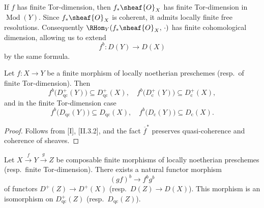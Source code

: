 \setcounter{page}{166}
If \(f\) has finite Tor-dimension, then \(f_*\sheaf{O}_X\) has finite Tor-dimension in \(\operatorname{Mod}(Y)\). Since \(f_*\sheaf{O}_X\) is coherent, it admits locally finite free resolutions. Consequently \(\RHom_Y(f_*\sheaf{O}_X,\,\cdot)\) has finite cohomological dimension, allowing us to extend
\[
f^{b}\colon D(Y) \to D(X)
\]
by the same formula.

\begin{proposition}
Let \(f: X \to Y\) be a finite morphism of locally noetherian preschemes (resp.\ of finite Tor-dimension). Then
\[
f^{b}\bigl(D_{\mathrm{qc}}^{+}(Y)\bigr) \subseteq D_{\mathrm{qc}}^{+}(X),\quad
f^{b}\bigl(D_{\mathrm{c}}^{+}(Y)\bigr) \subseteq D_{\mathrm{c}}^{+}(X),
\]
and in the finite Tor-dimension case
\[
f^{b}\bigl(D_{\mathrm{qc}}(Y)\bigr) \subseteq D_{\mathrm{qc}}(X),\quad
f^{b}\bigl(D_{\mathrm{c}}(Y)\bigr) \subseteq D_{\mathrm{c}}(X).
\]
\end{proposition}

\begin{proof}
Follows from [I], [II.3.2], and the fact \(\overline{f}^*\) preserves quasi-coherence and coherence of sheaves.
\end{proof}

\setcounter{page}{167}
\begin{proposition}
Let \(X\xrightarrow{f} Y\xrightarrow{g} Z\) be composable finite morphisms of locally noetherian preschemes (resp.\ finite Tor-dimension). There exists a natural functor morphism
\[
(g f)^{b} \to f^{b} g^{b}
\]
of functors \(D^+(Z)\to D^+(X)\) (resp.\ \(D(Z)\to D(X)\)). This morphism is an isomorphism on \(D_{\mathrm{qc}}^+(Z)\) (resp.\ \(D_{\mathrm{qc}}(Z)\)).
\end{proposition}

